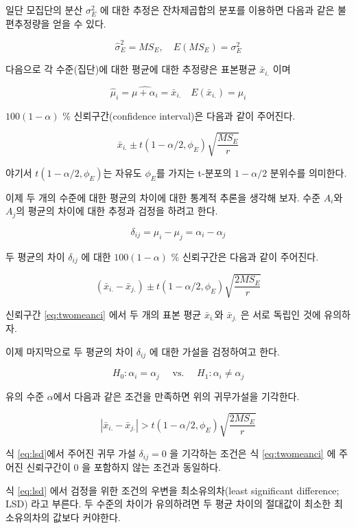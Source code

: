 \documentclass[
]{book}
\begin{document}
일단 모집단의 분산 \(\sigma_E^2\) 에 대한 추정은 잔차제곱합의 분포를 이용하면 다음과 같은 불편추정량을 얻을 수 있다.

\[ \hat \sigma_E^2 = MS_E, \quad E(MS_E) = \sigma_E^2 \]

다음으로 각 수준(집단)에 대한 평균에 대한 추정량은 표본평균 \(\bar {x}_{i.}\) 이며

\[ \hat \mu_i = \widehat {\mu + \alpha_i} = \bar {x}_{i.}  \quad E(\bar {x}_{i.}) =\mu_i \]

\(100(1-\alpha)\) \% 신뢰구간(confidence interval)은 다음과 같이 주어진다.

\[ \bar {x}_{i.} \pm t(1-\alpha/2, \phi_E) \sqrt{ \frac{MS_E}{r}} \]

야기서 \(t(1-\alpha/2, \phi_E)\)는 자유도 \(\phi_E\)를 가지는 t-분포의 \(1-\alpha/2\) 분위수를 의미한다.

이제 두 개의 수준에 대한 평균의 차이에 대한 통계적 추론을 생각해 보자. 수준 \(A_i\)와 \(A_j\)의 평균의 차이에 대한 추정과 검정을 하려고 한다.

\[ \delta_{ij} = \mu_i-\mu_j = \alpha_i - \alpha_j \]

두 평균의 차이 \(\delta_{ij}\) 에 대한 \(100(1-\alpha)\) \% 신뢰구간은 다음과 같이 주어진다.

\begin{equation}
( \bar {x}_{i.} - \bar {x}_{j.})   \pm t(1-\alpha/2, \phi_E) \sqrt{ \frac{2MS_E}{r}} 
\label{eq:twomeanci}
\end{equation}

신뢰구간 \eqref{eq:twomeanci} 에서 두 개의 표본 평균 \(\bar {x}_{i.}\)와 \(\bar {x}_{j.}\) 은 서로 독립인 것에 유의하자.

이제 마지막으로 두 평균의 차이 \(\delta_{ij}\) 에 대한 가설을 검정하여고 한다.

\[ H_0 : \alpha_i = \alpha_j \quad \text{ vs. } \quad H_1: \alpha_i \ne \alpha_j \]

유의 수준 \(\alpha\)에서 다음과 같은 조건을 만족하면 위의 귀무가설을 기각한다.

\begin{equation}
 \left | \bar {x}_{i.} - \bar {x}_{j.} \right | > t(1-\alpha/2, \phi_E) \sqrt{ \frac{2MS_E}{r}} 
\label{eq:lsd}
\end{equation}

식 \eqref{eq:lsd}에서 주어진 귀무 가설 \(\delta_{ij}=0\) 을 기각하는 조건은 식 \eqref{eq:twomeanci} 에 주어진 신뢰구간이 0 을 포함하지 않는 조건과 동일하다.

식 \eqref{eq:lsd} 에서 검정을 위한 조건의 우변을 최소유의차(least significant difference; LSD) 라고 부른다. 두 수준의 차이가 유의하려면 두 평균 차이의 절대값이 최소한 최소유의차의 값보다 커야한다.
\end{document}
